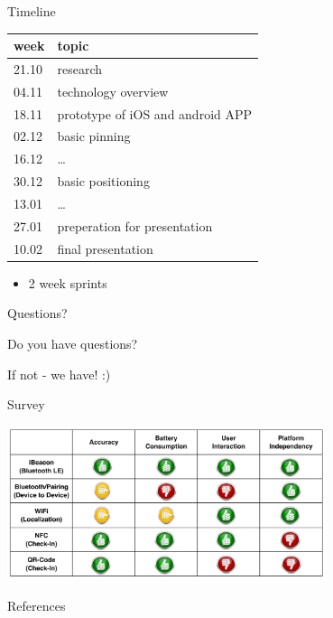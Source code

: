 \documentclass[11pt]{beamer}
\begin{document}
\begin{frame}{Timeline}

    \begin{center}
        
        \begin{tabular}{ll}
            week  &  topic \\
            \midrule 
            21.10 &  research \\
            04.11 &  technology overview \\
            18.11 &  prototype of iOS and android APP \\
            02.12 &  basic pinning \\
            16.12 &  \ldots \\
            30.12 &  basic positioning \\
            13.01 &  \ldots \\
            27.01 &  preperation for presentation \\
            10.02 &  final presentation \\
        \end{tabular}

    \end{center}

    \begin{itemize}
        \item 2 week sprints
    \end{itemize}

\end{frame}

\begin{frame}{Questions?}

    \begin{center}

        {\Huge Do you have questions?}
        
        \vspace{1cm}
        
        {\Large If not - we have! :)}
        
    \end{center}

\end{frame}

\begin{frame}{Survey}

    \begin{center}

        \includegraphics[width=0.7\textwidth]{matrix}
        
    \end{center}

\end{frame}


\begin{frame}[allowframebreaks]{References}

	\nocite{*}
	

\end{frame}
\end{document}
